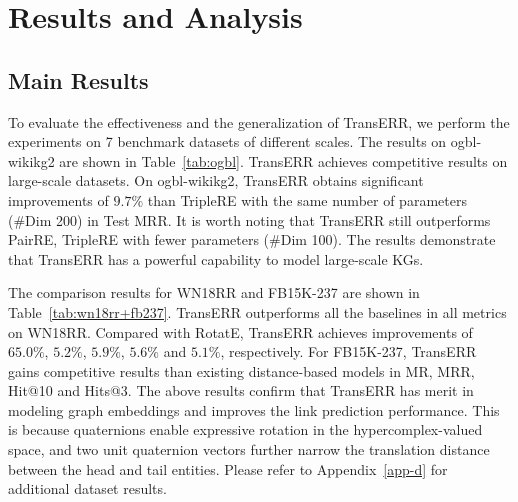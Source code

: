 \documentclass[11pt]{article}
\begin{document}
\section{Results and Analysis}\label{sec6}

\subsection{Main Results}\label{sec6.1}

To evaluate the effectiveness and the generalization of TransERR, we perform the experiments on 7 benchmark datasets of different scales. The results on ogbl-wikikg2 are shown in Table~\ref{tab:ogbl}. TransERR achieves competitive results on large-scale datasets. On ogbl-wikikg2,  TransERR obtains significant improvements of $9.7\%$ than TripleRE with the same number of parameters (\#Dim 200) in Test MRR.  It is worth noting that TransERR still outperforms PairRE, TripleRE with fewer parameters (\#Dim 100). The results demonstrate that TransERR has a powerful capability to model large-scale KGs.








The comparison results for WN18RR and FB15K-237 are shown in Table~\ref{tab:wn18rr+fb237}. TransERR outperforms all the baselines in all metrics on WN18RR. Compared with RotatE, TransERR achieves improvements of $65.0\%$, $5.2\%$, $5.9\%$, $5.6\%$ and $5.1\%$, respectively. For FB15K-237, TransERR gains competitive results than existing distance-based models in MR, MRR, Hit@10 and Hits@3. The above results confirm that TransERR has merit in modeling graph embeddings and improves the link prediction performance. This is because quaternions enable expressive rotation in the hypercomplex-valued space, and two unit quaternion vectors further narrow the translation distance between the head and tail entities. Please refer to Appendix~\ref{app-d} for additional dataset results. 




	
\end{document}
